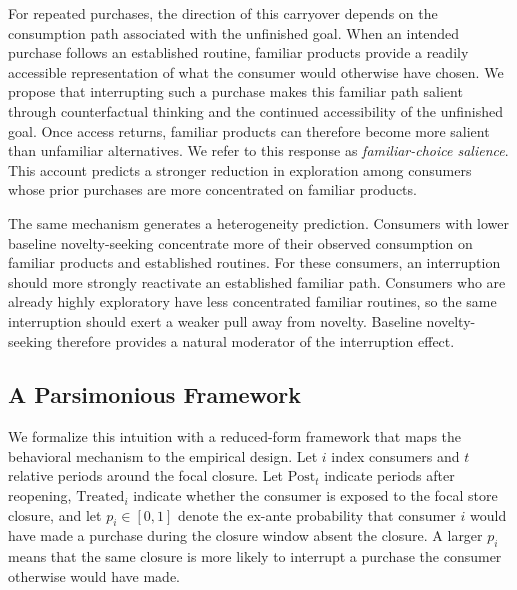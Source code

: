 \documentclass[11 pt]{article}
\begin{document}
For repeated purchases, the direction of this carryover depends on the consumption path associated with the unfinished goal. When an intended purchase follows an established routine, familiar products provide a readily accessible representation of what the consumer would otherwise have chosen. We propose that interrupting such a purchase makes this familiar path salient through counterfactual thinking and the continued accessibility of the unfinished goal. Once access returns, familiar products can therefore become more salient than unfamiliar alternatives. We refer to this response as \textit{familiar-choice salience}. This account predicts a stronger reduction in exploration among consumers whose prior purchases are more concentrated on familiar products.

The same mechanism generates a heterogeneity prediction. Consumers with lower baseline novelty-seeking concentrate more of their observed consumption on familiar products and established routines. For these consumers, an interruption should more strongly reactivate an established familiar path. Consumers who are already highly exploratory have less concentrated familiar routines, so the same interruption should exert a weaker pull away from novelty. Baseline novelty-seeking therefore provides a natural moderator of the interruption effect.

\subsection{A Parsimonious Framework}
\label{section:Micro-Foundation}

We formalize this intuition with a reduced-form framework that maps the behavioral mechanism to the empirical design. Let $i$ index consumers and $t$ relative periods around the focal closure. Let $\text{Post}_{t}$ indicate periods after reopening, $\text{Treated}_{i}$ indicate whether the consumer is exposed to the focal store closure, and let $p_i\in[0,1]$ denote the ex-ante probability that consumer $i$ would have made a purchase during the closure window absent the closure. A larger $p_i$ means that the same closure is more likely to interrupt a purchase the consumer otherwise would have made.
\end{document}
